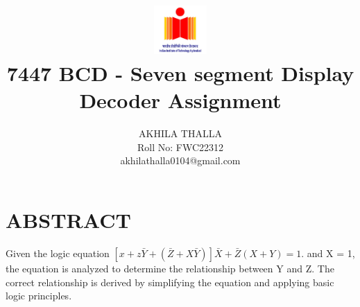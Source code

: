 \documentclass[conference]{IEEEtran}
\title{
\vspace{1cm}
{\includegraphics[width=0.15\textwidth]{1.jpg} \\ 
7447 BCD - Seven segment Display Decoder Assignment} }
\author{AKHILA THALLA\\ Roll No: FWC22312 \\akhilathalla0104@gmail.com}
\begin{document}
\maketitle
\section{ABSTRACT}
Given the logic equation $[x+z{\bar{Y} +(\bar{Z} +X\bar{Y})}]{\bar{X} +\bar{Z}(X+Y)}=1.$ and X = 1, the equation is analyzed to determine the relationship between Y and Z. The correct relationship is derived by simplifying the equation and applying basic logic principles.
\end{document}
